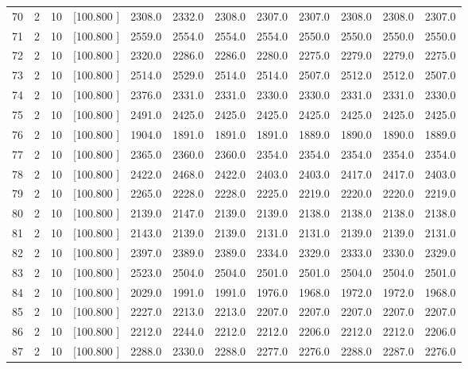 \documentclass[12pt,a4paper]{article}
\begin{document}
\begin{center}
{\begin{tabular}{r r r r r r r r r r r r}
  70&  2& 10&[100.800   ]&  2308.0&  2332.0&  2308.0&  2307.0&  2307.0&  2308.0&  2308.0&  2307.0\\[-0.02in]
  71&  2& 10&[100.800   ]&  2559.0&  2554.0&  2554.0&  2554.0&  2550.0&  2550.0&  2550.0&  2550.0\\[-0.02in]
  72&  2& 10&[100.800   ]&  2320.0&  2286.0&  2286.0&  2280.0&  2275.0&  2279.0&  2279.0&  2275.0\\[-0.02in]
  73&  2& 10&[100.800   ]&  2514.0&  2529.0&  2514.0&  2514.0&  2507.0&  2512.0&  2512.0&  2507.0\\[-0.02in]
  74&  2& 10&[100.800   ]&  2376.0&  2331.0&  2331.0&  2330.0&  2330.0&  2331.0&  2331.0&  2330.0\\[-0.02in]
  75&  2& 10&[100.800   ]&  2491.0&  2425.0&  2425.0&  2425.0&  2425.0&  2425.0&  2425.0&  2425.0\\[-0.02in]
  76&  2& 10&[100.800   ]&  1904.0&  1891.0&  1891.0&  1891.0&  1889.0&  1890.0&  1890.0&  1889.0\\[-0.02in]
  77&  2& 10&[100.800   ]&  2365.0&  2360.0&  2360.0&  2354.0&  2354.0&  2354.0&  2354.0&  2354.0\\[-0.02in]
  78&  2& 10&[100.800   ]&  2422.0&  2468.0&  2422.0&  2403.0&  2403.0&  2417.0&  2417.0&  2403.0\\[-0.02in]
  79&  2& 10&[100.800   ]&  2265.0&  2228.0&  2228.0&  2225.0&  2219.0&  2220.0&  2220.0&  2219.0\\[-0.02in]
  80&  2& 10&[100.800   ]&  2139.0&  2147.0&  2139.0&  2139.0&  2138.0&  2138.0&  2138.0&  2138.0\\[-0.02in]
  81&  2& 10&[100.800   ]&  2143.0&  2139.0&  2139.0&  2131.0&  2131.0&  2139.0&  2139.0&  2131.0\\[-0.02in]
  82&  2& 10&[100.800   ]&  2397.0&  2389.0&  2389.0&  2334.0&  2329.0&  2333.0&  2330.0&  2329.0\\[-0.02in]
  83&  2& 10&[100.800   ]&  2523.0&  2504.0&  2504.0&  2501.0&  2501.0&  2504.0&  2504.0&  2501.0\\[-0.02in]
  84&  2& 10&[100.800   ]&  2029.0&  1991.0&  1991.0&  1976.0&  1968.0&  1972.0&  1972.0&  1968.0\\[-0.02in]
  85&  2& 10&[100.800   ]&  2227.0&  2213.0&  2213.0&  2207.0&  2207.0&  2207.0&  2207.0&  2207.0\\[-0.02in]
  86&  2& 10&[100.800   ]&  2212.0&  2244.0&  2212.0&  2212.0&  2206.0&  2212.0&  2212.0&  2206.0\\[-0.02in]
  87&  2& 10&[100.800   ]&  2288.0&  2330.0&  2288.0&  2277.0&  2276.0&  2288.0&  2287.0&  2276.0\\[-0.02in]

\end{tabular}}
\end{center}
\end{document}
